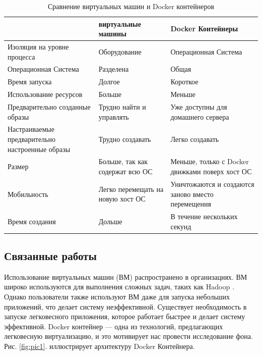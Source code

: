\documentclass{mirea}
\begin{document}
	\begin{table}[h]
		\centering
		\caption{Сравнение виртуальных машин и Docker контейнеров}
		\begin{tabular}{@{}p{4cm}p{4cm}p{4cm}@{}}
			\toprule
			& виртуальные машины & Docker Контейнеры \\ \midrule
			Изоляция на уровне процесса & Оборудование & Операционная Система \\
			Операционная Система & Разделена & Общая \\
			Время запуска & Долгое & Короткое \\
			Использование ресурсов & Больше & Меньше \\
			Предварительно созданные образы & Трудно найти и управлять & Уже доступны для домашнего сервера \\
			Настраиваемые предварительно настроенные образы & Трудно создавать & Легко создавать \\
			Размер & Больше, так как содержат всю ОС & Меньше, только с Docker движками поверх хост ОС \\
			Мобильность & Легко перемещать на новую хост ОС & Уничтожаются и создаются заново вместо перемещения \\
			Время создания & Дольше & В течение нескольких секунд \\ 
			\bottomrule
		\end{tabular}
	\end{table}

	\subsection{Связанные работы}
	
	Использование виртуальных машин (ВМ) распространено в организациях. ВМ широко используются для выполнения сложных задач, таких как Hadoop \cite{cit2}. Однако пользователи также используют ВМ даже для запуска небольших приложений, что делает систему неэффективной. Существует необходимость в запуске легковесного приложения, которое работает быстрее и делает систему эффективной. Docker контейнер — одна из технологий, предлагающих легковесную виртуализацию, и это мотивирует нас провести исследование фона. Рис. \ref{fig:pic1}. иллюстрирует архитектуру Docker Контейнера.
	
\end{document}
